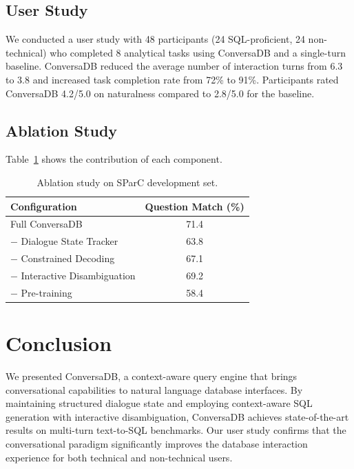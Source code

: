 \documentclass[sigconf,nonacm]{acmart}
\begin{document}
\subsection{User Study}

We conducted a user study with 48 participants (24 SQL-proficient, 24 non-technical) who completed 8 analytical tasks using ConversaDB and a single-turn baseline. ConversaDB reduced the average number of interaction turns from 6.3 to 3.8 and increased task completion rate from 72\% to 91\%. Participants rated ConversaDB 4.2/5.0 on naturalness compared to 2.8/5.0 for the baseline.

\subsection{Ablation Study}

Table~\ref{tab:ablation} shows the contribution of each component.

\begin{table}[t]
\caption{Ablation study on SParC development set.}
\label{tab:ablation}
\begin{tabular}{@{}lc@{}}
\toprule
\textbf{Configuration} & \textbf{Question Match (\%)} \\
\midrule
Full ConversaDB                    & 71.4 \\
$-$ Dialogue State Tracker         & 63.8 \\
$-$ Constrained Decoding           & 67.1 \\
$-$ Interactive Disambiguation     & 69.2 \\
$-$ Pre-training                   & 58.4 \\
\bottomrule
\end{tabular}
\end{table}

\section{Conclusion}

We presented ConversaDB, a context-aware query engine that brings conversational capabilities to natural language database interfaces. By maintaining structured dialogue state and employing context-aware SQL generation with interactive disambiguation, ConversaDB achieves state-of-the-art results on multi-turn text-to-SQL benchmarks. Our user study confirms that the conversational paradigm significantly improves the database interaction experience for both technical and non-technical users.
\end{document}
